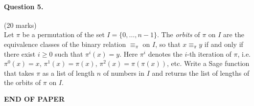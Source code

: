 \documentclass[12pt]{article}
\begin{document}
\paragraph{Question 5.}\hfill (20 marks)\\
Let $\pi$ be a permutation of the set $I=\{0,\dots,n-1\}$.  The {\em orbits} of
$\pi$ on $I$ are the  equivalence classes of the binary relation $\equiv_{\pi}$ on
$I$, so that $x\equiv_{\pi} y$ if and only if there exist $i\geq 0$ such that
$\pi^i(x)=y$. Here $\pi^i$ denotes the $i$-th iteration of $\pi$, i.e.
$\pi^0(x)=x$, 
$\pi^1(x)=\pi(x)$, $\pi^2(x)=\pi(\pi(x))$, etc.  Write a Sage function that
takes $\pi$ as a list of length $n$ of numbers in $I$ and returns the list of
lengths of the orbits of $\pi$ on $I$.

\vfill
\begin{center}{\bf END OF PAPER}\end{center}
\end{document}
